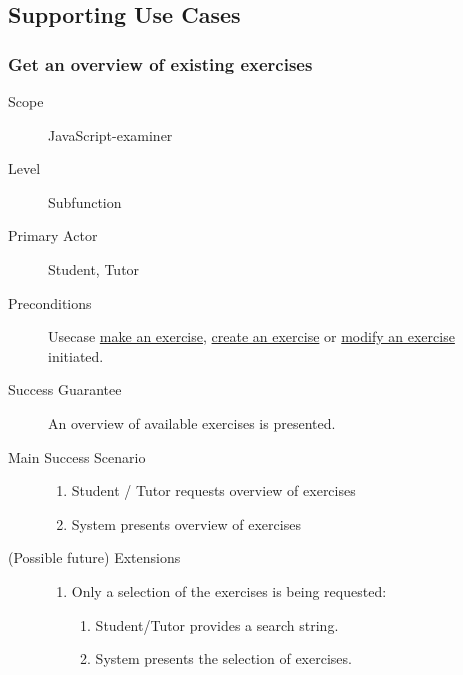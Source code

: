 \newpage
\subsection{Supporting Use Cases}

\subsubsection{Get an overview of existing exercises}
\begin{mdframed} [rightmargin=-100pt]
\begin{description}
  \item[Scope] JavaScript-examiner
  \item[Level] Subfunction
  \item[Primary Actor] Student, Tutor
  \item[Preconditions] Usecase \underline{make an exercise}, 
							   \underline{create an exercise} or
							   \underline{modify an exercise} initiated.
  \item[Success Guarantee] An overview of available exercises is 
    presented.
  \item[Main Success Scenario] \mbox{}
    \begin{enumerate} 
	  \item Student / Tutor requests overview of exercises
	  \item System presents overview of exercises
	\end{enumerate}
  \item[(Possible future) Extensions] \mbox{}
    \begin{enumerate}
	  \renewcommand{\labelenumi}{\theenumi a.}
	  \item Only a selection of the exercises is being requested:
		\begin{enumerate}[(1)]
		  \renewcommand{\labelenumii}{\theenumii .}
		  \item Student/Tutor provides a search string.
		  \item System presents the selection of exercises.
		\end{enumerate}
	\end{enumerate}
\end{description}
\end{mdframed}

